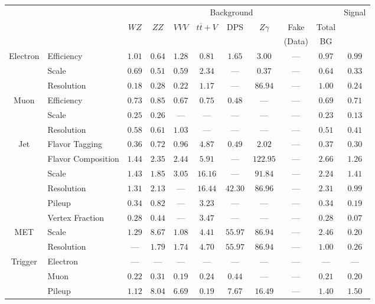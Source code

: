 \small\renewcommand{\tabcolsep}{4pt}
\begin{tabular}{|cl||ccccccc|c||c|}
\hline
 & & \multicolumn{8}{c||}{Background} & Signal \\ 
 & & $WZ$ & $ZZ$ & $VVV$ & $t\overline{t}+V$ & DPS & $Z\gamma$ & Fake & Total & \\ 
 & & &  &  &  &  &  & (Data) & BG & \\ 
\hline\hline
\multirow{3}{*}{Electron}
& Efficiency  & $ 1.01$  & $ 0.64$  & $ 1.28$  & $ 0.81$  & $ 1.65$  & $ 3.00$  & ---  & $ 0.97$  & $ 0.99$ \\ 
\cline{2-11}
& Scale  & $ 0.69$  & $ 0.51$  & $ 0.59$  & $ 2.34$  & ---  & $ 0.37$  & ---  & $ 0.64$  & $ 0.33$ \\ 
\cline{2-11}
& Resolution & $0.18$& $0.28$& $0.22$& $1.17$&  --- & $86.94$&  --- & $1.00$& $0.24$\\ 
\hline
\multirow{3}{*}{Muon}
& Efficiency & $0.73$& $0.85$& $0.67$& $0.75$& $0.48$&  --- &  --- & $0.69$& $0.71$\\ 
\cline{2-11}
& Scale & $0.25$& $0.26$&  --- &  --- &  --- &  --- &  --- & $0.23$& $0.13$\\ 
\cline{2-11}
& Resolution  & $ 0.58$  & $ 0.61$  & $ 1.03$  & ---  & ---  & ---  & ---  & $ 0.51$  & $ 0.41$ \\ 
\hline
\multirow{6}{*}{Jet}
& Flavor Tagging  & $ 0.36$  & $ 0.72$  & $ 0.96$  & $ 4.87$  & $ 0.49$  & $ 2.02$  & ---  & $ 0.37$  & $ 0.30$ \\ 
\cline{2-11}
& Flavor Composition  & $ 1.44$  & $ 2.35$  & $ 2.44$  & $ 5.91$  & ---  & $ 122.95$  & ---  & $ 2.66$  & $ 1.26$ \\ 
\cline{2-11}
& Scale  & $ 1.43$  & $ 1.85$  & $ 3.05$  & $ 16.16$  & ---  & $ 91.84$  & ---  & $ 2.24$  & $ 1.41$ \\ 
\cline{2-11}
& Resolution & $1.31$& $2.13$&  --- & $16.44$& $42.30$& $86.96$&  --- & $2.31$& $0.99$\\ 
\cline{2-11}
& Pileup  & $ 0.34$  & $ 0.82$  & ---  & $ 3.23$  & ---  & ---  & ---  & $ 0.34$  & $ 0.19$ \\ 
\cline{2-11}
& Vertex Fraction & $0.28$& $0.44$&  --- & $3.47$&  --- &  --- &  --- & $0.28$& $0.07$\\ 
\hline
\multirow{2}{*}{MET}
& Scale & $1.29$& $8.67$& $1.08$& $4.41$& $55.97$& $86.94$&  --- & $2.46$& $0.20$\\ 
\cline{2-11}
& Resolution &  --- & $1.79$& $1.74$& $4.70$& $55.97$& $86.94$&  --- & $1.00$& $0.26$\\ 
\hline
\multirow{2}{*}{Trigger}
& Electron & --- & --- & --- & --- & --- & --- & --- & --- & ---\\ 
\cline{2-11}
& Muon & $0.22$& $0.31$& $0.19$& $0.24$& $0.44$&  --- &  --- & $0.21$& $0.20$\\ 
\hline
& Pileup & $1.12$& $8.04$& $6.69$& $0.19$& $7.67$& $16.49$&  --- & $1.40$& $1.50$\\ 
\hline
\end{tabular}
